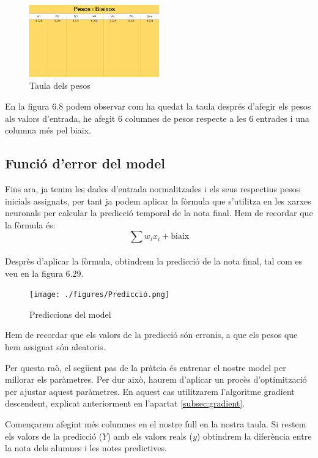 \begin{figure}[H]
    \centering
    \includegraphics[width=0.5\textwidth]{./figures/Pesos.png}
    \caption{Taula dels pesos}
\end{figure}

En la figura 6.8 podem observar com ha quedat la taula després d'afegir els pesos als valors d'entrada, he afegit 6 columnes de pesos respecte a les 6 entrades i una columna més pel biaix.

\subsection{Funció d'error del model}
Fins ara, ja tenim les dades d'entrada normalitzades i els seus respectius pesos inicials assignats, per tant ja podem aplicar la fòrmula que s'utilitza en les xarxes neuronals per calcular la predicció temporal de la nota final. Hem de recordar que la fòrmula és:\\
\[
\sum w_i x_i + \text{biaix}
\] \\
Desprès d'aplicar la fòrmula, obtindrem la predicció de la nota final, tal com es veu en la figura 6.29.

\begin{figure}[H]
    \centering
    \texttt{[image: ./figures/Predicció.png]}
    \caption{Prediccions del model}
 \end{figure}

Hem de recordar que els valors de la predicció són erronis, a que els pesos que hem assignat són aleatoris.

Per questa raò, el següent pas de la pràtcia és entrenar el nostre model per millorar els paràmetres. Per dur això, haurem d'aplicar un procès d'optimització per ajustar aquest paràmetres. En aquest cas utilitzarem l'algoritme gradient descendent, explicat anteriorment en l'apartat \ref{subsec:gradient}.

Començarem afegint més columnes en el nostre full en la nostra taula. Si restem els valors de la predicció ($Y$) amb els valors reals ($y$) obtindrem la diferència entre la nota dels alumnes i les notes predictives.

